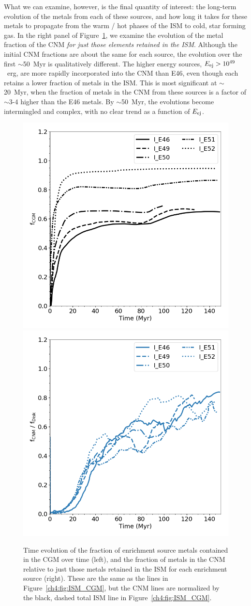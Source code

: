 What we can examine, however, is the final quantity of interest: the long-term evolution of the metals from each of these sources, and how long it takes for these metals to propagate from the warm / hot phases of the ISM to cold, star forming gas. In the right panel of Figure~\ref{ch4:fig:CGM_CNM}, we examine the evolution of the metal fraction of the CNM \textit{for just those elements retained in the ISM}. Although the initial CNM fractions are about the same for each source, the evolution over the first $\sim$50~Myr is qualitatively different. The higher energy sources, $E_{\rm ej} > 10^{49}$~erg, are more rapidly incorporated into the CNM than E46, even though each retains a lower fraction of metals in the ISM. This is most significant at $\sim$20~Myr, when the fraction of metals in the CNM from these sources is a factor of $\sim$3-4 higher than the E46 metals. By $\sim$50~Myr, the evolutions become intermingled and complex, with no clear trend as a function of $E_{\rm ej}$.

\begin{figure}
  \centering
  \includegraphics[width=0.45\linewidth]{figures/ch4/CGM_average_evolution}
  \includegraphics[width=0.45\linewidth]{figures/ch4/CNM_average_evolution}
  \caption{Time evolution of the fraction of enrichment source metals contained in the CGM over time (left), and the fraction of metals in the CNM relative to just those metals retained in the ISM for each enrichment source (right). These are the same as the lines in Figure~\ref{ch4:fig:ISM_CGM}, but the CNM lines are normalized by the black, dashed total ISM line in Figure~\ref{ch4:fig:ISM_CGM}.}
  \label{ch4:fig:CGM_CNM}
\end{figure}

